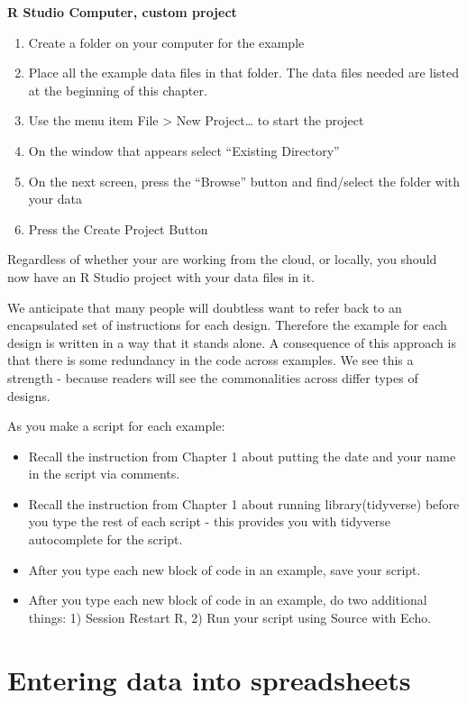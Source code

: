 \documentclass[
]{krantz}
\begin{document}
\textbf{R Studio Computer, custom project}

\begin{enumerate}
\def\labelenumi{\arabic{enumi}.}
\item
  Create a folder on your computer for the example
\item
  Place all the example data files in that folder. The data files needed are listed at the beginning of this chapter.
\item
  Use the menu item File \textgreater{} New Project\ldots{} to start the project
\item
  On the window that appears select ``Existing Directory''
\item
  On the next screen, press the ``Browse'' button and find/select the folder with your data
\item
  Press the Create Project Button
\end{enumerate}

Regardless of whether your are working from the cloud, or locally, you should now have an R Studio project with your data files in it.

We anticipate that many people will doubtless want to refer back to an encapsulated set of instructions for each design. Therefore the example for each design is written in a way that it stands alone. A consequence of this approach is that there is some redundancy in the code across examples. We see this a strength - because readers will see the commonalities across differ types of designs.

As you make a script for each example:

\begin{itemize}
\item
  Recall the instruction from Chapter 1 about putting the date and your name in the script via comments.
\item
  Recall the instruction from Chapter 1 about running library(tidyverse) before you type the rest of each script - this provides you with tidyverse autocomplete for the script.
\item
  After you type each new block of code in an example, save your script.
\item
  After you type each new block of code in an example, do two additional things: 1) Session Restart R, 2) Run your script using Source with Echo.
\end{itemize}

\hypertarget{entering-data-into-spreadsheets}{%
\section{Entering data into spreadsheets}\label{entering-data-into-spreadsheets}}
\end{document}
